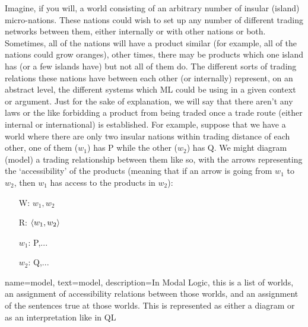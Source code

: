 Imagine, if you will, a world consisting of an arbitrary number of insular (island) micro-nations. These nations could wish to set up any number of different trading networks between them, either internally or with other nations or both. Sometimes, all of the nations will have a product similar (for example, all of the nations could grow oranges), other times, there may be products which one island has (or a few islands have) but not all of them do. The different sorts of trading relations these nations have between each other (or internally) represent, on an abstract level, the different systems which ML could be using in a given context or argument. Just for the sake of explanation, we will say that there aren't any laws or the like forbidding a product from being traded once a trade route (either internal or international) is established. For example, suppose that we have a world where there are only two insular nations within trading distance of each other, one of them ($w_1$) has P while the other ($w_2$) has Q. We might diagram (\gls{model}) a trading relationship between them like so, with the arrows representing the `accessibility' of the products (meaning that if an arrow is going from $w_1$ to $w_2$, then $w_1$ has access to the products in $w_2$):\\
\begin{center}
\end{center}
\begin{itemize}
\item[W:] $w_1,w_2$
\item[R:]$\langle w_1,w_2\rangle$  
\item[$w_1$:] P,...
\item[$w_2$:] Q,...
\end{itemize}
   
{
name={model},
text={model},
description={In Modal Logic, this is a list of worlds, an assignment of accessibility relations between those worlds, and an assignment of the sentences true at those worlds. This is represented as either a diagram or as an interpretation like in QL}
}
  
